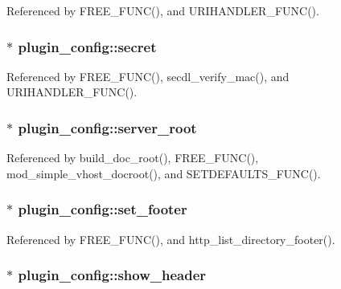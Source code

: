 Referenced by F\-R\-E\-E\-\_\-\-F\-U\-N\-C(), and U\-R\-I\-H\-A\-N\-D\-L\-E\-R\-\_\-\-F\-U\-N\-C().

\hypertarget{structplugin__config_a5b94a0762750cc54bb38e15eb1804a1e}{
\subsubsection[{secret}]{$\ast$ plugin\-\_\-config\-::secret}}\label{structplugin__config_a5b94a0762750cc54bb38e15eb1804a1e}


Referenced by F\-R\-E\-E\-\_\-\-F\-U\-N\-C(), secdl\-\_\-verify\-\_\-mac(), and U\-R\-I\-H\-A\-N\-D\-L\-E\-R\-\_\-\-F\-U\-N\-C().

\hypertarget{structplugin__config_a5d8982f6bebb4ce309f7eb6837e6dd3b}{
\subsubsection[{server\-\_\-root}]{$\ast$ plugin\-\_\-config\-::server\-\_\-root}}\label{structplugin__config_a5d8982f6bebb4ce309f7eb6837e6dd3b}


Referenced by build\-\_\-doc\-\_\-root(), F\-R\-E\-E\-\_\-\-F\-U\-N\-C(), mod\-\_\-simple\-\_\-vhost\-\_\-docroot(), and S\-E\-T\-D\-E\-F\-A\-U\-L\-T\-S\-\_\-\-F\-U\-N\-C().

\hypertarget{structplugin__config_a6051c6eccfe87465909ddc25490d5311}{
\subsubsection[{set\-\_\-footer}]{$\ast$ plugin\-\_\-config\-::set\-\_\-footer}}\label{structplugin__config_a6051c6eccfe87465909ddc25490d5311}


Referenced by F\-R\-E\-E\-\_\-\-F\-U\-N\-C(), and http\-\_\-list\-\_\-directory\-\_\-footer().

\hypertarget{structplugin__config_a972e1e36aeb701d39f42c7cae086e85e}{
\subsubsection[{show\-\_\-header}]{$\ast$ plugin\-\_\-config\-::show\-\_\-header}}\label{structplugin__config_a972e1e36aeb701d39f42c7cae086e85e}


